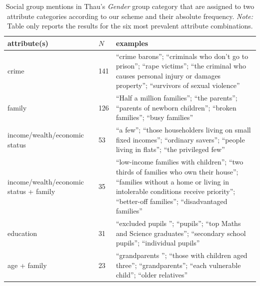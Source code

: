 \begin{table}[!th]
\centering
\caption{Social group mentions in Thau's \emph{Gender} group category that are assigned to two attribute categories according to our scheme and their absolute frequency. \emph{Note:} Table only reports the results for the six most prevalent attribute combinations.}
\label{tableC10}
\begin{tabular}{p{2.2in} l p{3in}}
\toprule
attribute(s) & $N$ & examples \\
\midrule
crime & 141 & ``crime barons''; ``criminals who don’t go to prison''; ``rape victims''; ``the criminal who causes personal injury or damages property''; ``survivors of sexual violence'' \\
family & 126 & ``Half a million families''; ``the parents''; ``parents of newborn children''; ``broken families''; ``busy families'' \\
income/wealth/economic status & 53 & ``a few''; ``those householders living on small fixed incomes''; ``ordinary savers''; ``people living in flats''; ``the privileged few'' \\
income/wealth/economic status + family & 35 & ``low-income families with children''; ``two thirds of families who own their house''; ``families without a home or living in intolerable conditions receive priority''; ``better-off families''; ``disadvantaged families'' \\
education & 31 & ``excluded pupils ''; ``pupils''; ``top Maths and Science graduates''; ``secondary school pupils''; ``individual pupils'' \\
age + family & 23 & ``grandparents ''; ``those with children aged three''; ``grandparents''; ``each vulnerable child''; ``older relatives'' \\
\bottomrule
\end{tabular}
\end{table}
